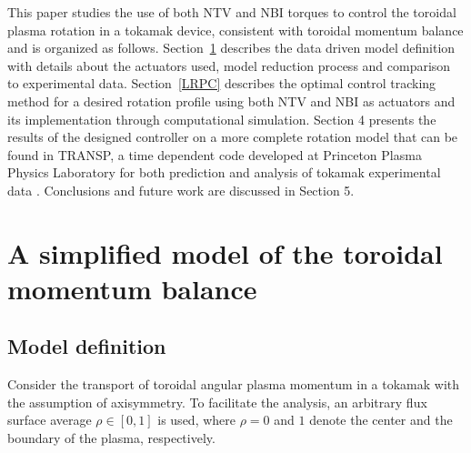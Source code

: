 \documentclass[12pt]{iopart}
\begin{document}
This paper studies the use of both NTV and NBI torques to control the toroidal plasma rotation in a tokamak device, consistent with toroidal momentum balance and is organized as follows.
 Section~\ref{MHW} describes the data driven model definition with details about the actuators used, model reduction process and comparison to experimental data. Section~\ref{LRPC} describes the optimal control tracking method for a desired rotation profile using both NTV and NBI as actuators and its implementation through computational simulation. Section 4 presents the results of the designed controller on a more complete rotation model that can be found in TRANSP, a time dependent code developed at Princeton Plasma Physics Laboratory for both prediction and analysis of tokamak experimental data \cite{Goldston81, Budny94}. Conclusions and future work are discussed in Section 5.


 \section{A simplified model of  the toroidal momentum balance }
 \label{MHW}
 
\subsection{Model definition}
Consider the transport of toroidal angular plasma momentum in a tokamak with the assumption of axisymmetry.  To facilitate the analysis, an arbitrary flux surface average $\rho \in [0,1]$ is used, where $\rho = 0$ and $1$ denote the center and the boundary of the plasma, respectively.  
\end{document}

